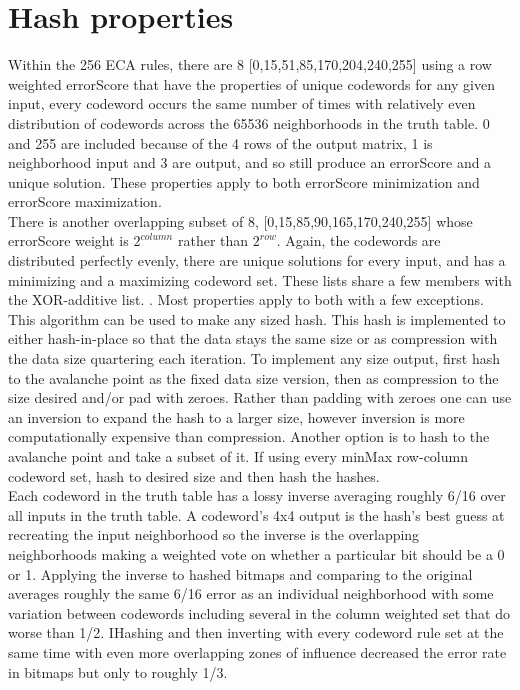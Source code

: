 \documentclass[11pt]{article}
\begin{document}
\section{Hash properties}

Within the 256 ECA rules, there are 8 [0,15,51,85,170,204,240,255] using a row weighted errorScore that have the properties of unique codewords for any given input, every codeword occurs the same number of times with relatively even distribution of codewords across the 65536 neighborhoods in the truth table. 0 and 255 are included because of the 4 rows of the output matrix, 1 is neighborhood input and 3 are output, and so still produce an errorScore and a unique solution. These properties apply to both errorScore minimization and errorScore maximization. \\

There is another overlapping subset of 8, [0,15,85,90,165,170,240,255] whose errorScore weight is $2^{column}$ rather than $2^{row}$. Again, the codewords are distributed perfectly evenly, there are unique solutions for every input, and has a minimizing and a maximizing codeword set. These lists share a few members with the XOR-additive list. \cite{xorAdditive}. Most properties apply to both with a few exceptions.\\

This algorithm can be used to make any sized hash. This hash is implemented to either hash-in-place so that the data stays the same size or as compression with the data size quartering each iteration. To implement any size output, first hash to the avalanche point as the fixed data size version, then as compression to the size desired and/or pad with zeroes. Rather than padding with zeroes one can use an inversion to expand the hash to a larger size, however inversion is more computationally expensive than compression. Another option is to hash to the avalanche point and take a subset of it. If using every minMax row-column codeword set, hash to desired size and then hash the hashes.\\

Each codeword in the truth table has a lossy inverse averaging roughly 6/16 over all inputs in the truth table. A codeword's 4x4 output is the hash's best guess at recreating the input neighborhood so the inverse is the overlapping neighborhoods making a weighted vote on whether a particular bit should be a 0 or 1. Applying the inverse to hashed bitmaps and comparing to the original averages roughly the same 6/16 error as an individual neighborhood with some variation between codewords including several in the column weighted set that do worse than 1/2. IHashing and then inverting with every codeword rule set at the same time with even more overlapping zones of influence decreased the error rate in bitmaps but only to roughly 1/3. \\
\end{document}

